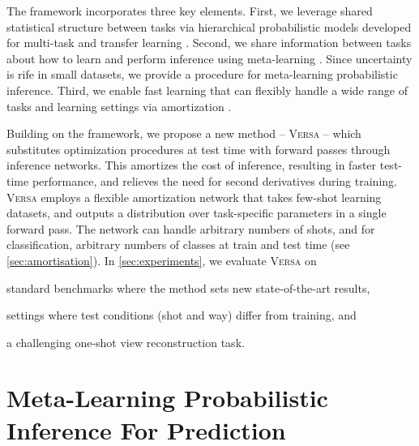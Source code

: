 \documentclass{article}
\newcommand{\Versa}{\textsc{Versa}}
\begin{document}
The framework incorporates three key elements. First, we leverage shared statistical structure between tasks via hierarchical probabilistic models developed for multi-task and transfer learning \citep{heskes2000empirical,bakker2003task}. 
Second, we share information between tasks about how to learn and perform inference using meta-learning \citep{naik1992meta,thrun2012learning,schmidhuber1987evolutionary}. Since uncertainty is rife in small datasets, we provide a procedure for meta-learning probabilistic inference.
Third, we enable fast learning that can flexibly handle a wide range of tasks and learning settings via amortization \citep{kingma2013auto,rezende2014stochastic}. 


Building on the framework, we propose a new method -- \Versa{} -- which substitutes optimization procedures at test time with forward passes through inference networks. This amortizes the cost of inference, resulting in faster test-time performance, and relieves the need for second derivatives during training. \Versa{} employs a flexible amortization network that takes few-shot learning datasets, and outputs a distribution over task-specific parameters in a single forward pass. The network can handle arbitrary numbers of shots, and for classification, arbitrary numbers of classes at train and test time (see \cref{sec:amortisation}). In \cref{sec:experiments}, we evaluate \Versa{} on 
\begin{inlinelist}
    \item standard benchmarks where the method sets new state-of-the-art results,
    \item settings where test conditions (shot and way) differ from training, and
    \item a challenging one-shot view reconstruction task.
\end{inlinelist}


























\section{Meta-Learning Probabilistic Inference For Prediction}
\label{sec:MLPIP}
\end{document}

